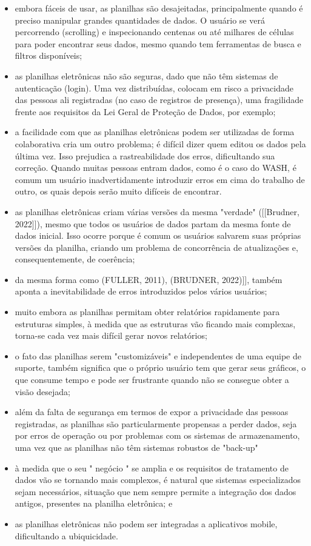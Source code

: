 \begin{itemize}
\item embora fáceis de usar, as planilhas são desajeitadas, principalmente quando é preciso manipular grandes quantidades de dados. O usuário se verá percorrendo (scrolling) e inspecionando centenas ou até milhares de células para poder encontrar seus dados, mesmo quando tem ferramentas de busca e filtros disponíveis;
\item as planilhas eletrônicas não são seguras, dado que não têm sistemas de autenticação (login). Uma vez distribuídas, colocam em risco a privacidade das pessoas ali registradas (no caso de registros de presença), uma fragilidade frente aos requisitos da Lei Geral de Proteção de Dados, por exemplo;
\item a facilidade com que as planilhas eletrônicas podem ser utilizadas de forma colaborativa cria um outro problema; é difícil dizer quem editou os dados pela última vez. Isso prejudica a rastreabilidade dos erros, dificultando sua correção. Quando muitas pessoas entram dados, como é o caso do WASH, é comum um usuário inadvertidamente introduzir erros em cima do trabalho de outro, os quais depois serão muito difíceis de encontrar.
\item as planilhas eletrônicas criam várias versões da mesma "verdade"  ([[Brudner, 2022]]), mesmo que todos os usuários de dados partam da mesma fonte de dados inicial. Isso ocorre porque é comum os usuários salvarem suas próprias versões da planilha, criando um problema de concorrência de atualizações e, consequentemente, de coerência;
\item da mesma forma como (FULLER, 2011),  (BRUDNER, 2022)]], também aponta a inevitabilidade de erros introduzidos pelos vários usuários;
\item muito embora as planilhas permitam obter relatórios rapidamente para estruturas simples, à medida que as estruturas vão ficando mais complexas, torna-se cada vez mais difícil gerar novos relatórios;
\item o fato das planilhas serem "customizáveis" e independentes de uma equipe de suporte, também significa que o próprio usuário tem que gerar seus gráficos, o que consume tempo e pode ser frustrante quando não se consegue obter a visão desejada;
\item além da falta de segurança em termos de expor a privacidade das pessoas registradas, as planilhas são particularmente propensas a perder dados, seja por erros de operação ou por problemas com os sistemas de armazenamento, uma vez que as planilhas não têm sistemas robustos de "back-up"
\item à medida que o seu " negócio " se amplia e os requisitos de tratamento de dados vão se tornando mais complexos, é natural que sistemas especializados sejam necessários, situação que nem sempre permite a integração dos dados antigos, presentes na planilha eletrônica; e
\item as planilhas eletrônicas não podem ser integradas a aplicativos mobile, dificultando a ubiquicidade.
\end{itemize}

